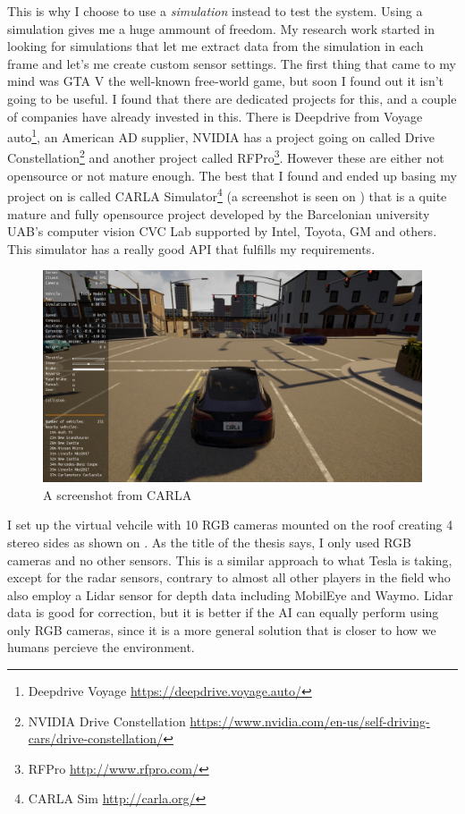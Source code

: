 This is why I choose to use a \emph{simulation} instead to test the system.
Using a simulation gives me a huge ammount of freedom. My research work started
in looking for simulations that let me extract data from the simulation in each
frame and let's me create custom sensor settings. The first thing that came to
my mind was GTA V the well-known free-world game, but soon I found out it isn't
going to be useful. I found that there are dedicated projects for this, and a
couple of companies have already invested in this. There is Deepdrive from
Voyage auto\footnote{Deepdrive Voyage \url{https://deepdrive.voyage.auto/}}, an
American AD supplier, NVIDIA has a project going on called Drive
Constellation\footnote{NVIDIA Drive Constellation
\url{https://www.nvidia.com/en-us/self-driving-cars/drive-constellation/}} and
another project called RFPro\footnote{RFPro \url{http://www.rfpro.com/}}.
However these are either not opensource or not mature enough. The best that I
found and ended up basing my project on is called CARLA Simulator\footnote{CARLA
Sim \url{http://carla.org/}} \cite{Dosovitskiy17} (a screenshot is seen on
) that is a quite mature and fully opensource project
developed by the Barcelonian university UAB's computer vision CVC Lab supported
by Intel, Toyota, GM and others. This simulator has a really good API that
fulfills my requirements.

\begin{figure}[!ht]
    \centering
    \includegraphics[width=150mm, keepaspectratio]{figures/carla.png}
    \caption{A screenshot from CARLA}
    \label{fig:carla}
\end{figure}

I set up the virtual vehcile with 10 RGB cameras mounted on the roof creating 4
stereo sides as shown on . As the title of the thesis
says, I only used RGB cameras and no other sensors. This is a similar approach
to what Tesla is taking, except for the radar sensors, contrary to almost all
other players in the field who also employ a Lidar sensor for depth data
including MobilEye and Waymo. Lidar data is good for correction, but it is
better if the AI can equally perform using only RGB cameras, since it is a more
general solution that is closer to how we humans percieve the environment.

